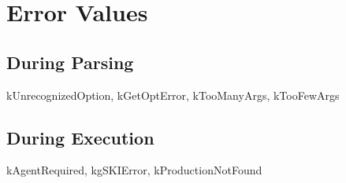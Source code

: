 \documentclass[10pt]{article}
\begin{document}
\section*{ Error Values }
\subsection*{ During Parsing }


 kUnrecognizedOption, kGetOptError, kTooManyArgs, kTooFewArgs
\subsection*{ During Execution }


 kAgentRequired, kgSKIError, kProductionNotFound
\end{document}
